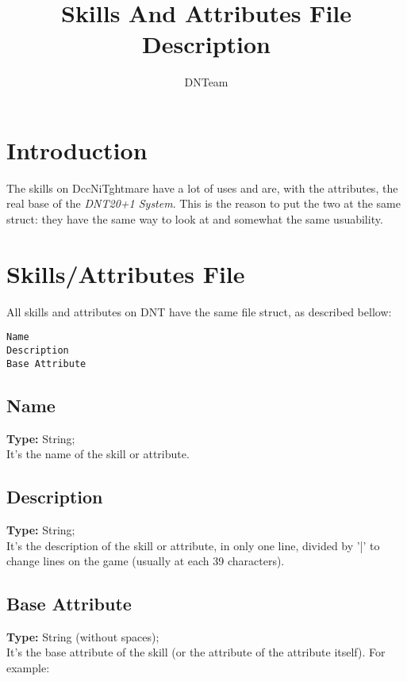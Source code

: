 \documentclass[letterpaper,12pt]{article}
\begin{document}
\title{Skills And Attributes File Description}

\author{
DNTeam
}

\maketitle


\newpage

\tableofcontents

\newpage


\section{Introduction}

The skills on DccNiTghtmare have a lot of uses and are, with the attributes,
the real base of the {\it DNT20+1 System}. This is the reason to put the two at
the same struct: they have the same way to look at and somewhat the same
usuability.

\section{Skills/Attributes File}

All skills and attributes on DNT have the same file struct, as described bellow:

\begin{verbatim}
Name
Description
Base Attribute
\end{verbatim}

\subsection{Name}
{\bf Type:} String;\\
It's the name of the skill or attribute.

\subsection{Description}
{\bf Type:} String;\\
It's the description of the skill or attribute, in only one line, divided by '|' to change lines on the game (usually at each 39 characters).

\subsection{Base Attribute}
{\bf Type:} String (without spaces);\\
It's the base attribute of the skill (or the attribute of the attribute itself). For example:
\end{document}
